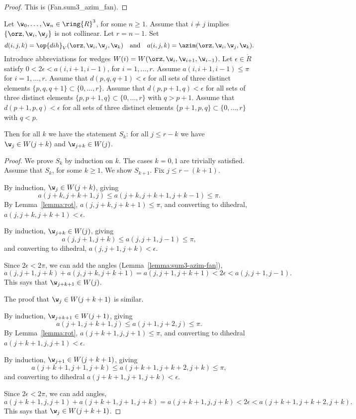 \begin{proof} This is (Fan.sum3\_azim\_fan).
\end{proof}



\begin{lemma} \label{lemma:deform-wedge} 
Let $\w_0,\ldots,\w_{n}\in \ring{R}^3$, for some $n\ge 1$.  Assume that $i\ne j$ implies
$\{\orz,\w_i,\w_j\}$ is not collinear.   Let $r=n-1$.
Set
\[
d(i,j,k)=\op{dih}_V(\orz,\w_i,\w_j,\w_k) \quad\text{and}\quad a(i,j,k) = \azim(\orz,\w_i,\w_j,\w_k).
\]
Introduce abbreviations for  wedges $W(i) = W(\orz,\w_i,\w_{i+1},\w_{i-1})$.
Let $\epsilon\in\ring{R}$ satisfy $0 < 2 \epsilon < a(i,i+1,i-1)$, for $i=1,\ldots,r$.
Assume $a(i,i+1,i-1) \le \pi$ for $i=1,\ldots,r$.
Assume that $d(p,q,q+1)<\epsilon$ for all sets of three distinct elements $\{p,q,q+1\}\subset \{0,\ldots,r\}$.
Assume that $d(p,p+1,q)<\epsilon$ for all sets of three distinct elements $\{p,p+1,q\}\subset \{0,\ldots,r\}$ with
$q > p+1$.
Assume that $d(p+1,p,q)<\epsilon$ for all sets of three distinct elements $\{p+1,p,q\}\subset \{0,\ldots,r\}$ with
$q < p$. 

Then for all $k$ we have the statement $S_k$: 
for all $j\le r - k$ we have $\w_j\in W({j+k})$ and $\w_{j+k}\in W(j)$.
\end{lemma}

\begin{proof} We prove $S_k$ by induction on $k$.  The cases $k=0,1$ are trivially satisfied.
Assume that $S_k$, for some $k\ge1$.  We show $S_{k+1}$.  Fix $j\le r-(k+1)$.

By induction, $\w_j\in W({j+k})$, giving
\[
a(j+k,j+k+1,j)\le a(j+k,j+k+1,j+k-1)\le\pi.
\]
By Lemma~\ref{lemma:rot}, $a(j,j+k,j+k+1)\le\pi$, and converting to dihedral, $a(j,j+k,j+k+1)< \epsilon$.

By induction, $\w_{j+k}\in W(j)$, giving
\[
a(j,j+1,j+k)\le a(j,j+1,j-1)\le \pi,
\]
and converting to dihedral, $a(j,j+1,j+k)<\epsilon$.

Since $2\epsilon < 2\pi$, we can add the angles (Lemma~\ref{lemma:sum3-azim-fan}),
\[
a(j,j+1,j+k) + a(j,j+k,j+k+1) = a(j,j+1,j+k+1) < 2\epsilon < a(j,j+1,j-1).
\]
This says that $\w_{j+k+1}\in W(j)$.

The proof that $\w_j\in W({j+k+1})$ is similar.

By induction, $\w_{j+k+1}\in W({j+1})$, giving
\[
a(j+1,j+k+1,j)\le a(j+1,j+2,j)\le \pi.
\]
By Lemma~\ref{lemma:rot}, $a(j+k+1,j,j+1)\le \pi$, and converting to dihedral $a(j+k+1,j,j+1)<\epsilon$.

By induction, $\w_{j+1}\in W({j+k+1})$, giving
\[
a(j+k+1,j+1,j+k)\le a (j+k+1,j+k+2,j+k)\le \pi,
\]
and converting to dihedral $a(j+k+1,j+1,j+k) < \epsilon$.

Since $2\epsilon < 2\pi$, we can add angles,
\[
a(j+k+1,j,j+1) + a(j+k+1,j+1,j+k) = a(j+k+1,j,j+k) < 2 \epsilon < a(j+k+1,j+k+2,j+k).
\]
This says that $\w_{j}\in W({j+k+1})$.
\end{proof}

